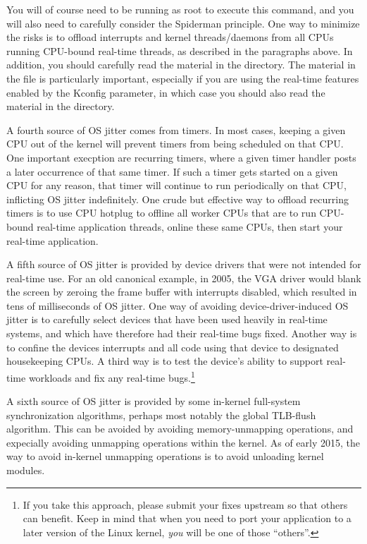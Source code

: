 You will of course need to be running as root to execute this command,
and you will also need to carefully consider the Spiderman principle.
One way to minimize the risks is to offload interrupts and
kernel threads/daemons from all CPUs running CPU-bound real-time
threads, as described in the paragraphs above.
In addition, you should carefully read the material in the
 directory.
The material in the  file is particularly
important, especially if you are using the  real-time features
enabled by the  Kconfig parameter, in which
case you should also read the material in the
 directory.

A fourth source of OS jitter comes from timers.
In most cases, keeping a given CPU out of the kernel will prevent
timers from being scheduled on that CPU.
One important execption are recurring timers, where a given timer
handler posts a later occurrence of that same timer.
If such a timer gets started on a given CPU for any reason, that
timer will continue to run periodically on that CPU, inflicting
OS jitter indefinitely.
One crude but effective way to offload recurring timers is to
use CPU hotplug to offline all worker CPUs that are to run CPU-bound
real-time application threads, online these same CPUs, then start
your real-time application.

A fifth source of OS jitter is provided by device drivers that were
not intended for real-time use.
For an old canonical example, in 2005, the VGA driver would blank
the screen by zeroing the frame buffer with interrupts disabled,
which resulted in tens of milliseconds of OS jitter.
One way of avoiding device-driver-induced OS jitter is to carefully
select devices that have been used heavily in real-time systems,
and which have therefore had their real-time bugs fixed.
Another way is to confine the devices interrupts and all code using
that device to designated housekeeping CPUs.
A third way is to test the device's ability to support real-time
workloads and fix any real-time bugs.\footnote{
	If you take this approach, please submit your fixes upstream
	so that others can benefit.
	Keep in mind that when you need to port your application to
	a later version of the Linux kernel, \emph{you} will be one of those
	``others''.}

A sixth source of OS jitter is provided by some in-kernel
full-system synchronization algorithms, perhaps most notably
the global TLB-flush algorithm.
This can be avoided by avoiding memory-unmapping operations, and expecially
avoiding unmapping operations within the kernel.
As of early 2015, the way to avoid in-kernel
unmapping operations is to avoid unloading kernel modules.

